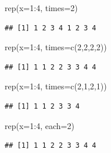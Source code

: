 \documentclass[
]{book}
\makeatletter
\newenvironment{Shaded}{\begin{snugshade}}{\end{snugshade}}
\newcommand{\AttributeTok}[1]{\textcolor[rgb]{0.77,0.63,0.00}{#1}}
\newcommand{\DecValTok}[1]{\textcolor[rgb]{0.00,0.00,0.81}{#1}}
\newcommand{\FunctionTok}[1]{\textcolor[rgb]{0.00,0.00,0.00}{#1}}
\newcommand{\NormalTok}[1]{#1}
\newcommand{\SpecialCharTok}[1]{\textcolor[rgb]{0.00,0.00,0.00}{#1}}
\newenvironment{kframe}{%
\medskip{}
\setlength{\fboxsep}{.8em}
 \def\at@end@of@kframe{}%
 \ifinner\ifhmode%
  \def\at@end@of@kframe{\end{minipage}}%
  \begin{minipage}{\columnwidth}%
 \fi\fi%
 \def\FrameCommand##1{\hskip\@totalleftmargin \hskip-\fboxsep
 \colorbox{shadecolor}{##1}\hskip-\fboxsep
     \hskip-\linewidth \hskip-\@totalleftmargin \hskip\columnwidth}%
 \MakeFramed {\advance\hsize-\width
   \@totalleftmargin\z@ \linewidth\hsize
   \@setminipage}}%
 {\par\unskip\endMakeFramed%
 \at@end@of@kframe}
\renewenvironment{Shaded}{\begin{kframe}}{\end{kframe}}
\makeatother
\begin{document}
\begin{Shaded}
\begin{Highlighting}[]
\FunctionTok{rep}\NormalTok{(}\AttributeTok{x=}\DecValTok{1}\SpecialCharTok{:}\DecValTok{4}\NormalTok{, }\AttributeTok{times=}\DecValTok{2}\NormalTok{)}
\end{Highlighting}
\end{Shaded}

\begin{verbatim}
## [1] 1 2 3 4 1 2 3 4
\end{verbatim}

\begin{Shaded}
\begin{Highlighting}[]
\FunctionTok{rep}\NormalTok{(}\AttributeTok{x=}\DecValTok{1}\SpecialCharTok{:}\DecValTok{4}\NormalTok{, }\AttributeTok{times=}\FunctionTok{c}\NormalTok{(}\DecValTok{2}\NormalTok{,}\DecValTok{2}\NormalTok{,}\DecValTok{2}\NormalTok{,}\DecValTok{2}\NormalTok{))}
\end{Highlighting}
\end{Shaded}

\begin{verbatim}
## [1] 1 1 2 2 3 3 4 4
\end{verbatim}

\begin{Shaded}
\begin{Highlighting}[]
\FunctionTok{rep}\NormalTok{(}\AttributeTok{x=}\DecValTok{1}\SpecialCharTok{:}\DecValTok{4}\NormalTok{, }\AttributeTok{times=}\FunctionTok{c}\NormalTok{(}\DecValTok{2}\NormalTok{,}\DecValTok{1}\NormalTok{,}\DecValTok{2}\NormalTok{,}\DecValTok{1}\NormalTok{))}
\end{Highlighting}
\end{Shaded}

\begin{verbatim}
## [1] 1 1 2 3 3 4
\end{verbatim}

\begin{Shaded}
\begin{Highlighting}[]
\FunctionTok{rep}\NormalTok{(}\AttributeTok{x=}\DecValTok{1}\SpecialCharTok{:}\DecValTok{4}\NormalTok{, }\AttributeTok{each=}\DecValTok{2}\NormalTok{)}
\end{Highlighting}
\end{Shaded}

\begin{verbatim}
## [1] 1 1 2 2 3 3 4 4
\end{verbatim}
\end{document}
